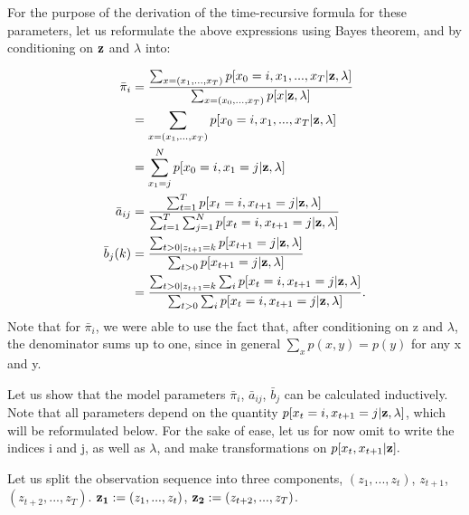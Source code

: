\documentclass{article}
\begin{document}
For the purpose of the derivation of the time-recursive formula for these parameters, let us reformulate the above expressions using Bayes theorem, and by conditioning on ${\bf{z}}$ and $\lambda$ into:

\begin{align}
\bar \pi_i &=  \frac{\sum_{x=(x_1,...,x_T)} \label{e7} p[x_0=i,x_1,...,x_T|{\bf{z}}, \lambda]}{\sum_{x=(x_0,...,x_T)} p[x|{\bf{z}},\lambda]} \nonumber \\
&= \sum_{x=(x_1,...,x_T)} \label{} p[x_0=i,x_1,...,x_T|{\bf{z}}, \lambda] \nonumber \\
&= \sum_{x_1=j}^N \label{} p[x_0=i,x_1=j|{\bf{z}}, \lambda]
\nonumber \\
\bar a_{ij} &= \frac{\sum_{t=1}^T  p[x_t=i,x_{t+1}=j|{\bf{z}},\lambda]}  {\sum_{t=1}^T \sum_{j =1}^N p[x_t=i,x_{t+1}=j|{\bf{z}},\lambda]}
\nonumber \\
 \bar b_j(k) & = \frac{\sum_{t>0| z_{t+1} = k} p[x_{t+1}=j|{\bf{z}},\lambda]}{\sum_{t>0} p[x_{t+1}=j|{\bf{z}},\lambda]} \nonumber \\
 & = \frac{\sum_{t>0| z_{t+1} = k} \sum_i p[x_t = i, x_{t+1}=j|{\bf{z}},\lambda]}{\sum_{t>0} \sum_i p[x_t = i, x_{t+1}=j|{\bf{z}},\lambda]}. \label{equ_lamb}
\end{align}
 Note that for $\bar \pi_i$, we were able to use the fact that, after conditioning on z and $\lambda$, the denominator sums up to one, since in general $\sum_x p(x,y) = p(y)$ for any x and y.\newline


Let us show that the model parameters $\bar \pi_i$, $\bar a_{ij}$, $\bar b_j$ can be calculated inductively. Note that all parameters depend on the quantity $p[x_t = i, x_{t+1}=j|{\bf{z}},\lambda]$, which will be reformulated below. For the sake of ease, let us for now omit to write the indices i and j, as well as $\lambda$, and make transformations on $p[x_t, x_{t+1}|{\bf{z}}].$\newline


Let us split the observation sequence into three components, $(z_1,...,z_t)$, $z_{t+1}$, $(z_{t+2},...,z_T)$.
${\bf{z_1}}:= (z_1,...,z_t)$, ${\bf{z_2}}:= (z_{t+2},...,z_T)$.
\end{document}
